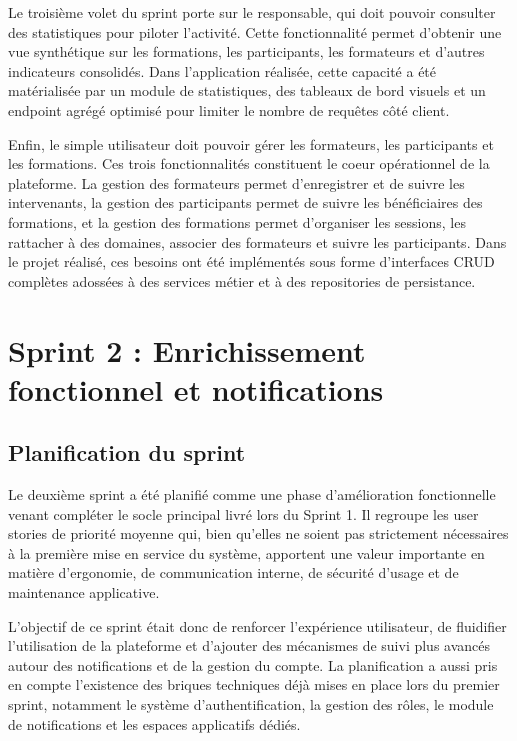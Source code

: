 \documentclass[12pt,a4paper]{report}
\begin{document}
Le troisième volet du sprint porte sur le responsable, qui doit pouvoir consulter des statistiques pour piloter l'activité. Cette fonctionnalité permet d'obtenir une vue synthétique sur les formations, les participants, les formateurs et d'autres indicateurs consolidés. Dans l'application réalisée, cette capacité a été matérialisée par un module de statistiques, des tableaux de bord visuels et un endpoint agrégé optimisé pour limiter le nombre de requêtes côté client.

Enfin, le simple utilisateur doit pouvoir gérer les formateurs, les participants et les formations. Ces trois fonctionnalités constituent le coeur opérationnel de la plateforme. La gestion des formateurs permet d'enregistrer et de suivre les intervenants, la gestion des participants permet de suivre les bénéficiaires des formations, et la gestion des formations permet d'organiser les sessions, les rattacher à des domaines, associer des formateurs et suivre les participants. Dans le projet réalisé, ces besoins ont été implémentés sous forme d'interfaces CRUD complètes adossées à des services métier et à des repositories de persistance.

\section{Sprint 2 : Enrichissement fonctionnel et notifications}

\subsection{Planification du sprint}
Le deuxième sprint a été planifié comme une phase d'amélioration fonctionnelle venant compléter le socle principal livré lors du Sprint 1. Il regroupe les user stories de priorité moyenne qui, bien qu'elles ne soient pas strictement nécessaires à la première mise en service du système, apportent une valeur importante en matière d'ergonomie, de communication interne, de sécurité d'usage et de maintenance applicative.

L'objectif de ce sprint était donc de renforcer l'expérience utilisateur, de fluidifier l'utilisation de la plateforme et d'ajouter des mécanismes de suivi plus avancés autour des notifications et de la gestion du compte. La planification a aussi pris en compte l'existence des briques techniques déjà mises en place lors du premier sprint, notamment le système d'authentification, la gestion des rôles, le module de notifications et les espaces applicatifs dédiés.
\end{document}

